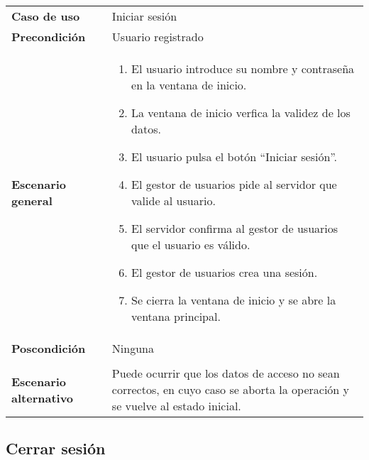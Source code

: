 {\footnotesize
\begin{tabularx}{0.95\textwidth}{p{}|X}

\textbf{Caso de uso} & Iniciar sesión \\

\textbf{Precondición} & Usuario registrado \\

\textbf{Escenario general} & \begin{enumerate}
\item El usuario introduce su nombre y contraseña en la ventana de inicio.
\item La ventana de inicio verfica la validez de los datos.
\item El usuario pulsa el botón ``Iniciar sesión''.
\item El gestor de usuarios pide al servidor que valide al usuario.
\item El servidor confirma al gestor de usuarios que el usuario es válido.
\item El gestor de usuarios crea una sesión.
\item Se cierra la ventana de inicio y se abre la ventana principal.
\end{enumerate} \\

\textbf{Poscondición} & Ninguna \\ \\

\textbf{Escenario alternativo} & Puede ocurrir que los datos de acceso no sean
correctos, en cuyo caso se aborta la operación y se vuelve al estado inicial.

\end{tabularx}
}

\subsection{Cerrar sesión}

